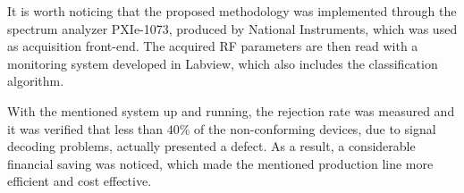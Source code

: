 \documentclass[conference]{IEEEtran}
\begin{document}
It is worth noticing that the proposed methodology was implemented through the spectrum analyzer PXIe-1073, produced by National Instruments, which was used as acquisition front-end. The acquired RF parameters are then read with a monitoring system developed in Labview, which also includes the classification algorithm.

With the mentioned system up and running, the rejection rate was measured and it was verified that less than $40\%$ of the non-conforming devices, due to signal decoding problems, actually presented a defect. As a result, a considerable financial saving was noticed, which made the mentioned production line more efficient and cost effective.


%
%



%
%
\end{document}
